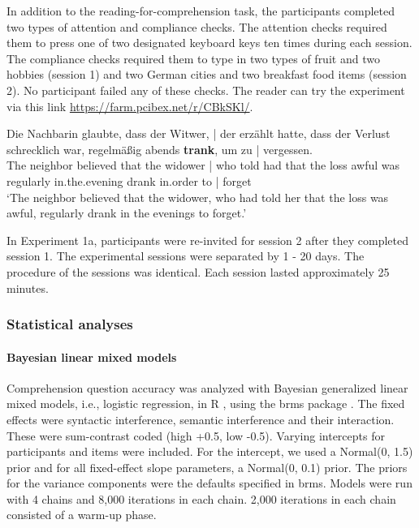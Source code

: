 \documentclass[a4paper, man, floatsintext]{apa7}
\begin{document}
In addition to the reading-for-comprehension task, the participants completed two types of attention and compliance checks. The attention checks required them to press one of two designated keyboard keys ten times during each session. The compliance checks required them to type in two types of fruit and two hobbies (session 1) and two German cities and two breakfast food items (session 2). No participant failed any of these checks. The reader can try the experiment via this link \hyperlink{https://farm.pcibex.net/r/CBkSKl/}{https://farm.pcibex.net/r/CBkSKl/}. 

\begin{exe}  
\ex \label{ex:linebreak}
    \gll Die Nachbarin glaubte, dass der Witwer, | der erzählt hatte, dass der Verlust schrecklich war, regelmäßig abends \textbf{trank}, um zu | vergessen. \\ 
    The neighbor believed that the widower | who told had that the loss awful was regularly in.the.evening drank in.order to | forget\\
    \trans  `The neighbor believed that the widower, who had told her that the loss was awful, regularly drank in the evenings to forget.'\\  
\end{exe}

In Experiment 1a, participants were re-invited for session 2 after they completed session 1. The experimental sessions were separated by 1 - 20 days. The procedure of the sessions was identical. Each session lasted approximately 25 minutes.

\subsubsection{Statistical analyses}

\paragraph{Bayesian linear mixed models}
Comprehension question accuracy was analyzed with Bayesian generalized linear mixed models, i.e., logistic regression, in R \citep{r}, using the brms package \citep{brms}. The fixed effects were syntactic interference, semantic interference and their interaction. These were sum-contrast coded (high +0.5, low -0.5). Varying intercepts for participants and items were included. For the intercept, we used a Normal(0, 1.5) prior and  for all fixed-effect slope parameters, a Normal(0, 0.1) prior. The priors for the variance components were the defaults specified in brms. Models were run with 4 chains and 8,000 iterations in each chain. 2,000 iterations in each chain consisted of a warm-up phase. 
\end{document}
